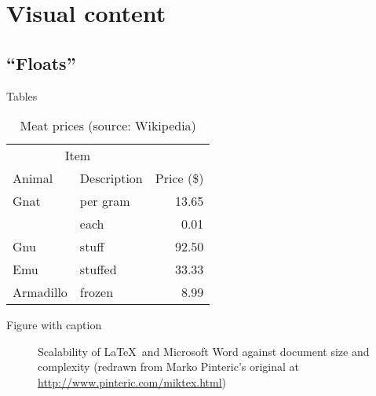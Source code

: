 \documentclass[aspectratio=169%
]{beamer}
\begin{document}
\section{Visual content}
\label{sec:content}

\subsection{\enquote{Floats}}

\begin{frame}{Tables}
  \centering{}
  \begin{table}
    \centering{}
    \caption{Meat prices (source: Wikipedia)}
    \begin{tabular}{llr}
      \toprule
      \multicolumn{2}{c}{Item} &                          \\
      \cmidrule{1-2}
      Animal                   & Description & Price (\$) \\
      \midrule
      Gnat                     & per gram    & 13.65      \\
                               & each        & 0.01       \\
      Gnu                      & stuff       & 92.50      \\
      Emu                      & stuffed     & 33.33      \\
      Armadillo                & frozen      & 8.99       \\
      \bottomrule
    \end{tabular}
  \end{table}
\end{frame}

\begin{frame}{Figure with caption}
  \centering{}
  \begin{figure}
    \centering
    \caption{Scalability of \LaTeX\ and Microsoft Word\textsuperscript{\textregistered} against document size and complexity (redrawn from Marko Pinteric's original at \url{http://www.pinteric.com/miktex.html})}
  \end{figure}
\end{frame}
\end{document}

